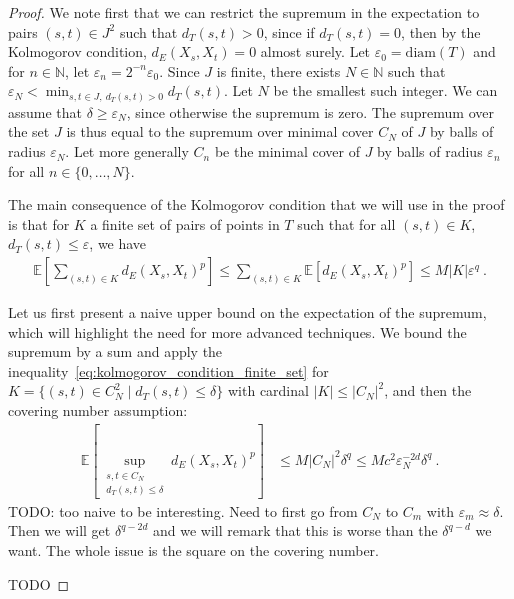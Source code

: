 \documentclass[lean]{Draft}
\begin{document}
\begin{proof}
We note first that we can restrict the supremum in the expectation to pairs $(s, t) \in J^2$ such that $d_T(s, t) > 0$, since if $d_T(s, t) = 0$, then by the Kolmogorov condition, $d_E(X_s, X_t) = 0$ almost surely.
Let $\varepsilon_0 = \mathrm{diam}(T)$ and for $n \in \mathbb{N}$, let $\varepsilon_n = 2^{-n} \varepsilon_0$.
Since $J$ is finite, there exists $N \in \mathbb{N}$ such that $\varepsilon_N < \min_{s, t \in J, \: d_T(s, t) > 0} d_T(s, t)$. Let $N$ be the smallest such integer.
We can assume that $\delta \ge \varepsilon_N$, since otherwise the supremum is zero.
The supremum over the set $J$ is thus equal to the supremum over minimal cover $C_N$ of $J$ by balls of radius $\varepsilon_N$.
Let more generally $C_n$ be the minimal cover of $J$ by balls of radius $\varepsilon_n$ for all $n \in \{0, \dots, N\}$.

The main consequence of the Kolmogorov condition that we will use in the proof is that for $K$ a finite set of pairs of points in $T$ such that for all $(s,t) \in K$, $d_T(s, t) \le \varepsilon$, we have
\begin{align}
  \mathbb{E}\left[ \sum_{(s,t) \in K} d_E(X_s, X_t)^p \right]
  \le \sum_{(s,t) \in K} \mathbb{E}\left[ d_E(X_s, X_t)^p \right]
  \le M \lvert K \rvert \varepsilon^q
  \: .\label{eq:kolmogorov_condition_finite_set}
\end{align}

Let us first present a naive upper bound on the expectation of the supremum, which will highlight the need for more advanced techniques.
We bound the supremum by a sum and apply the inequality~\eqref{eq:kolmogorov_condition_finite_set} for $K = \{(s,t) \in C_N^2 \mid d_T(s, t) \le \delta\}$ with cardinal $\lvert K \rvert \le \lvert C_N \rvert^2$, and then the covering number assumption:
\begin{align*}
  \mathbb{E}\left[ \sup_{\substack{s, t \in C_N \\ d_T(s, t) \le \delta}} d_E(X_s, X_t)^p \right]
  &\le M \lvert C_N \rvert^2 \delta^q
  \le M c^2 \varepsilon_N^{-2d} \delta^q
  \: .
\end{align*}
TODO: too naive to be interesting. Need to first go from $C_N$ to $C_m$ with $\varepsilon_m \approx \delta$.
Then we will get $\delta^{q - 2d}$ and we will remark that this is worse than the $\delta^{q - d}$ we want.
The whole issue is the square on the covering number.

TODO



\end{proof}
\end{document}
